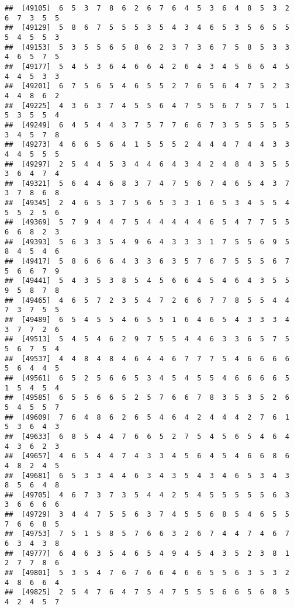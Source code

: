 \documentclass[
]{book}
\begin{document}
\begin{verbatim}
##  [49105]  6  5  3  7  8  6  2  6  7  6  4  5  3  6  4  8  5  3  2  6  7  3  5  5
##  [49129]  5  8  6  7  5  5  5  3  5  4  3  4  6  5  3  5  6  5  5  5  4  5  5  3
##  [49153]  5  3  5  5  6  5  8  6  2  3  7  3  6  7  5  8  5  3  3  4  6  5  7  5
##  [49177]  5  4  5  3  6  4  6  6  4  2  6  4  3  4  5  6  6  4  5  4  4  5  3  3
##  [49201]  6  7  5  6  5  4  6  5  5  2  7  6  5  6  4  7  5  2  3  4  4  8  6  2
##  [49225]  4  3  6  3  7  4  5  5  6  4  7  5  5  6  7  5  7  5  1  5  3  5  5  4
##  [49249]  6  4  5  4  4  3  7  5  7  7  6  6  7  3  5  5  5  5  5  3  4  5  7  8
##  [49273]  4  6  6  5  6  4  1  5  5  5  2  4  4  4  7  4  4  3  3  4  4  5  5  5
##  [49297]  2  5  4  4  5  3  4  4  6  4  3  4  2  4  8  4  3  5  5  3  6  4  7  4
##  [49321]  5  6  4  4  6  8  3  7  4  7  5  6  7  4  6  5  4  3  7  3  7  8  6  8
##  [49345]  2  4  6  5  3  7  5  6  5  3  3  1  6  5  3  4  5  5  4  5  5  2  5  6
##  [49369]  5  7  9  4  4  7  5  4  4  4  4  4  6  5  4  7  7  5  5  6  6  8  2  3
##  [49393]  5  6  3  3  5  4  9  6  4  3  3  3  1  7  5  5  6  9  5  8  4  5  4  6
##  [49417]  5  8  6  6  6  4  3  3  6  3  5  7  6  7  5  5  5  6  7  5  6  6  7  9
##  [49441]  5  4  3  5  3  8  5  4  5  6  6  4  5  4  6  4  3  5  5  9  5  8  7  8
##  [49465]  4  6  5  7  2  3  5  4  7  2  6  6  7  7  8  5  5  4  4  7  3  7  5  5
##  [49489]  6  5  4  5  5  4  6  5  5  1  6  4  6  5  4  3  3  3  4  3  7  7  2  6
##  [49513]  5  4  5  4  6  2  9  7  5  5  4  4  6  3  3  6  5  7  5  5  6  7  5  4
##  [49537]  4  4  8  4  8  4  6  4  4  6  7  7  7  5  4  6  6  6  6  5  6  4  4  5
##  [49561]  6  5  2  5  6  6  5  3  4  5  4  5  5  4  6  6  6  6  5  1  5  4  5  4
##  [49585]  6  5  5  6  6  5  2  5  7  6  6  7  8  3  5  3  5  2  6  5  4  5  5  7
##  [49609]  7  6  4  8  6  2  6  5  4  6  4  2  4  4  4  2  7  6  1  5  3  6  4  3
##  [49633]  6  8  5  4  4  7  6  6  5  2  7  5  4  5  6  5  4  6  4  4  3  6  2  3
##  [49657]  4  6  5  4  4  7  4  3  3  4  5  6  4  5  4  6  6  8  6  4  8  2  4  5
##  [49681]  6  5  3  3  4  4  6  3  4  3  5  4  3  4  6  5  3  4  3  8  5  6  4  8
##  [49705]  4  6  7  3  7  3  5  4  4  2  5  4  5  5  5  5  5  6  3  3  6  6  6  6
##  [49729]  3  4  4  7  5  5  6  3  7  4  5  5  6  8  5  4  6  5  5  7  6  6  8  5
##  [49753]  7  5  1  5  8  5  7  6  6  3  2  6  7  4  4  7  4  6  7  6  3  4  3  8
##  [49777]  6  4  6  3  5  4  6  5  4  9  4  5  4  3  5  2  3  8  1  2  7  7  8  6
##  [49801]  5  3  5  4  7  6  7  6  6  4  6  6  5  5  6  3  5  3  2  4  8  6  6  4
##  [49825]  2  5  4  7  6  4  7  5  4  7  5  5  5  6  6  5  6  8  5  4  2  4  5  7

\end{verbatim}
\end{document}
